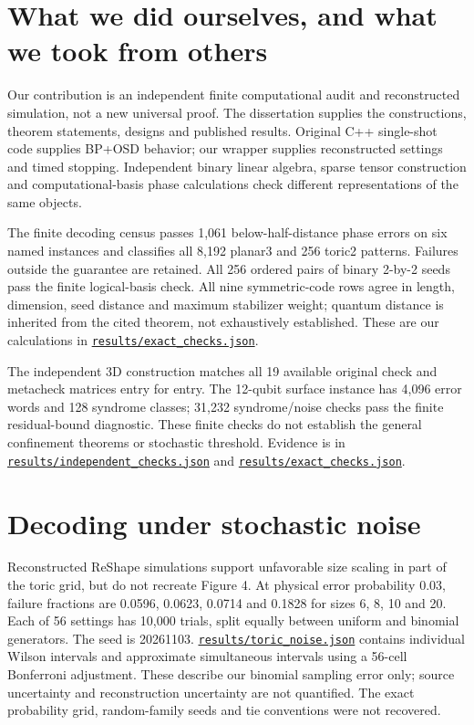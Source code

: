 \documentclass[11pt]{article}
\begin{document}
\section{What we did ourselves, and what we took from others}
Our contribution is an independent finite computational audit and reconstructed simulation, not a new universal proof. The dissertation supplies the constructions, theorem statements, designs and published results. Original C++ single-shot code supplies BP+OSD behavior; our wrapper supplies reconstructed settings and timed stopping. Independent binary linear algebra, sparse tensor construction and computational-basis phase calculations check different representations of the same objects.

The finite decoding census passes 1,061 below-half-distance phase errors on six named instances and classifies all 8,192 planar3 and 256 toric2 patterns. Failures outside the guarantee are retained. All 256 ordered pairs of binary 2-by-2 seeds pass the finite logical-basis check. All nine symmetric-code rows agree in length, dimension, seed distance and maximum stabilizer weight; quantum distance is inherited from the cited theorem, not exhaustively established. These are our calculations in \href{https://github.com/alectionary/vibe-math/blob/master/formalization/quintavalle-hgp/results/exact_checks.json}{\nolinkurl{results/exact_checks.json}}.

The independent 3D construction matches all 19 available original check and metacheck matrices entry for entry. The 12-qubit surface instance has 4,096 error words and 128 syndrome classes; 31,232 syndrome/noise checks pass the finite residual-bound diagnostic. These finite checks do not establish the general confinement theorems or stochastic threshold. Evidence is in \href{https://github.com/alectionary/vibe-math/blob/master/formalization/quintavalle-hgp/results/independent_checks.json}{\nolinkurl{results/independent_checks.json}} and \href{https://github.com/alectionary/vibe-math/blob/master/formalization/quintavalle-hgp/results/exact_checks.json}{\nolinkurl{results/exact_checks.json}}.

\section{Decoding under stochastic noise}
Reconstructed ReShape simulations support unfavorable size scaling in part of the toric grid, but do not recreate Figure 4. At physical error probability 0.03, failure fractions are 0.0596, 0.0623, 0.0714 and 0.1828 for sizes 6, 8, 10 and 20. Each of 56 settings has 10,000 trials, split equally between uniform and binomial generators. The seed is 20261103. \href{https://github.com/alectionary/vibe-math/blob/master/formalization/quintavalle-hgp/results/toric_noise.json}{\nolinkurl{results/toric_noise.json}} contains individual Wilson intervals and approximate simultaneous intervals using a 56-cell Bonferroni adjustment. These describe our binomial sampling error only; source uncertainty and reconstruction uncertainty are not quantified. The exact probability grid, random-family seeds and tie conventions were not recovered.
\end{document}
